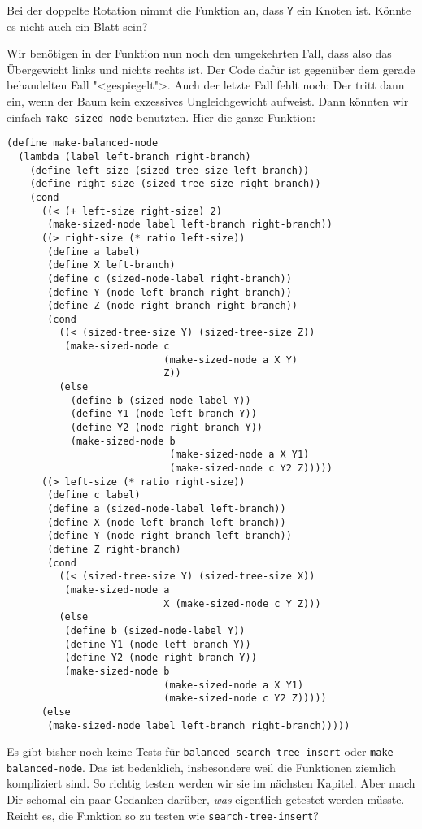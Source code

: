 %
\begin{aufgabeinline}
  Bei der doppelte Rotation nimmt die Funktion an, dass \lstinline{Y}
  ein Knoten ist.  Könnte es nicht auch ein Blatt sein?
\end{aufgabeinline}
%
Wir benötigen in der Funktion nun noch den umgekehrten Fall, dass also
das Übergewicht links und nichts rechts ist.  Der Code dafür ist
gegenüber dem gerade behandelten Fall "<gespiegelt">.  Auch der letzte
Fall fehlt noch: Der tritt dann ein,  wenn der Baum kein exzessives
Ungleichgewicht aufweist.  Dann könnten wir einfach
\lstinline{make-sized-node} benutzten.  Hier die ganze Funktion:
%
\begin{lstlisting}
(define make-balanced-node
  (lambda (label left-branch right-branch)
    (define left-size (sized-tree-size left-branch))
    (define right-size (sized-tree-size right-branch))
    (cond
      ((< (+ left-size right-size) 2)
       (make-sized-node label left-branch right-branch))
      ((> right-size (* ratio left-size))
       (define a label)
       (define X left-branch)
       (define c (sized-node-label right-branch))
       (define Y (node-left-branch right-branch))
       (define Z (node-right-branch right-branch))
       (cond
         ((< (sized-tree-size Y) (sized-tree-size Z))
          (make-sized-node c
                           (make-sized-node a X Y)
                           Z))
         (else
           (define b (sized-node-label Y))
           (define Y1 (node-left-branch Y))
           (define Y2 (node-right-branch Y))
           (make-sized-node b
                            (make-sized-node a X Y1)
                            (make-sized-node c Y2 Z)))))
      ((> left-size (* ratio right-size))
       (define c label)
       (define a (sized-node-label left-branch))
       (define X (node-left-branch left-branch))
       (define Y (node-right-branch left-branch))
       (define Z right-branch)
       (cond
         ((< (sized-tree-size Y) (sized-tree-size X))
          (make-sized-node a
                           X (make-sized-node c Y Z)))
         (else
          (define b (sized-node-label Y))
          (define Y1 (node-left-branch Y))
          (define Y2 (node-right-branch Y))
          (make-sized-node b
                           (make-sized-node a X Y1)
                           (make-sized-node c Y2 Z)))))
      (else
       (make-sized-node label left-branch right-branch)))))
\end{lstlisting}
%
\begin{aufgabeinline}
  Es gibt bisher noch keine Tests für
  \lstinline{balanced-search-tree-insert} oder
  \lstinline{make-balanced-node}.  Das ist bedenklich, insbesondere
  weil die Funktionen ziemlich kompliziert sind.  So richtig testen
  werden wir sie im nächsten Kapitel.  Aber mach Dir schomal ein paar
  Gedanken darüber, \emph{was} eigentlich getestet werden müsste.  Reicht es,
  die Funktion so zu testen wie \lstinline{search-tree-insert}?
\end{aufgabeinline}

